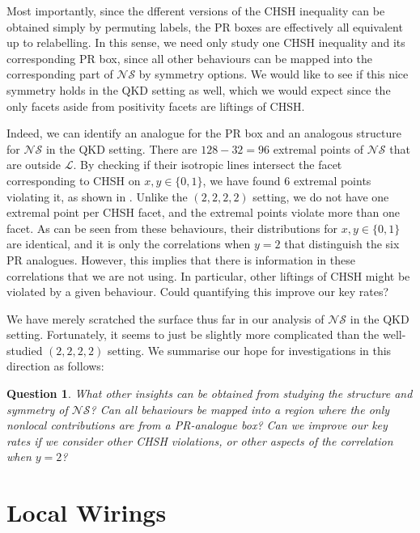 \documentclass[10pt, a4paper]{article}
\numberwithin{equation}{section} %
\theoremstyle{definition}
\theoremstyle{plain}
\newtheorem{question}{Question}
\newcommand{\?}{\mathrel{?}} %
\newcommand{\Ls}{\mathcal{L}}
\newcommand{\NSs}{\mathcal{NS}}
\begin{document}
      Most importantly, since the dfferent versions of the CHSH inequality can be obtained simply by permuting labels, the PR boxes are effectively all equivalent up to relabelling. In this sense, we need only study one CHSH inequality and its corresponding PR box, since all other behaviours can be mapped into the corresponding part of \(\NSs\) by symmetry options. We would like to see if this nice symmetry holds in the QKD setting as well, which we would expect since the only facets aside from positivity facets are liftings of CHSH.

      Indeed, we can identify an analogue for the PR box and an analogous structure for \(\NSs\) in the QKD setting. There are \(128 - 32 = 96\) extremal points of \(\NSs\) that are outside \(\Ls\). By checking if their isotropic lines intersect the facet corresponding to CHSH on \(x, y \in \{0,1\}\), we have found 6 extremal points violating it, as shown in . Unlike the \((2,2,2,2)\) setting, we do not have one extremal point per CHSH facet, and the extremal points violate more than one facet. As can be seen from these behaviours, their distributions for \(x, y \in \{0,1\}\) are identical, and it is only the correlations when \(y = 2\) that distinguish the six PR analogues. However, this implies that there is information in these correlations that we are not using. In particular, other liftings of CHSH might be violated by a given behaviour. Could quantifying this improve our key rates?

      We have merely scratched the surface thus far in our analysis of \(\NSs\) in the QKD setting. Fortunately, it seems to just be slightly more complicated than the well-studied \((2,2,2,2)\) setting. We summarise our hope for investigations in this direction as follows:
      \begin{question}
        What other insights can be obtained from studying the structure and symmetry of \(\NSs\)? Can all behaviours be mapped into a region where the only nonlocal contributions are from a PR-analogue box? Can we improve our key rates if we consider other CHSH violations, or other aspects of the correlation when \(y=2\)?
      \end{question}

      \section{Local Wirings}\label{sec:locwir}
\end{document}
